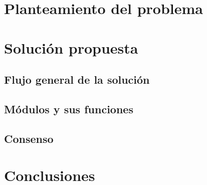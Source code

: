 \documentclass{report}
\begin{document}

    \tableofcontents

    \chapter{\LARGE{Planteamiento del problema}}
    


    \chapter{\LARGE{Solución propuesta}}

    \section{\Large{Flujo general de la solución}}
    


    \section{\Large{Módulos y sus funciones}}
    

    \section{\Large{Consenso}}
    


    \chapter{\LARGE{Conclusiones}}
    

    \newpage  
    \printbibliography
\end{document}
